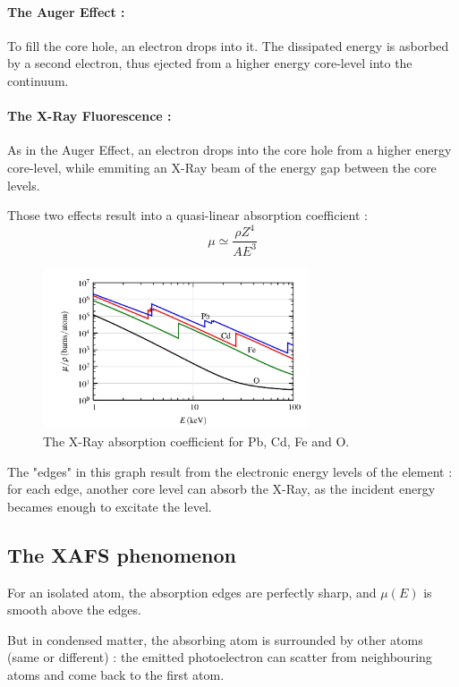 \documentclass[11pt,a4paper,oneside]{report}
\begin{document}
\paragraph{The Auger Effect :} To fill the core hole, an electron drops into it. The dissipated energy is asborbed by a second electron, thus ejected from a higher energy core-level into the continuum.

\paragraph{The X-Ray Fluorescence :} As in the Auger Effect, an electron drops into the core hole from a higher energy core-level, while emmiting an X-Ray beam of the energy gap between the core levels.

Those two effects result into a quasi-linear absorption coefficient :
\[\mu \simeq \frac{\rho Z^4}{A E^3}\]
\begin{figure}[H]
    \begin{center}
        \includegraphics[width=0.7\textwidth]{Images/AbsorptionCoeff}
        \caption{The X-Ray absorption coefficient for Pb, Cd, Fe and O.}
        \label{absorptionCoeff}
    \end{center}
\end{figure}

The "edges" in this graph result from the electronic energy levels of the element : for each edge, another core level can absorb the X-Ray, as the incident energy becames enough to excitate the level.

\newpage
\subsection{The XAFS phenomenon}
For an isolated atom, the absorption edges are perfectly sharp, and $\mu(E)$ is smooth above the edges.

But in condensed matter, the absorbing atom is surrounded by other atoms (same or different) : the emitted photoelectron can scatter from neighbouring atoms and come back to the first atom.
\end{document}
